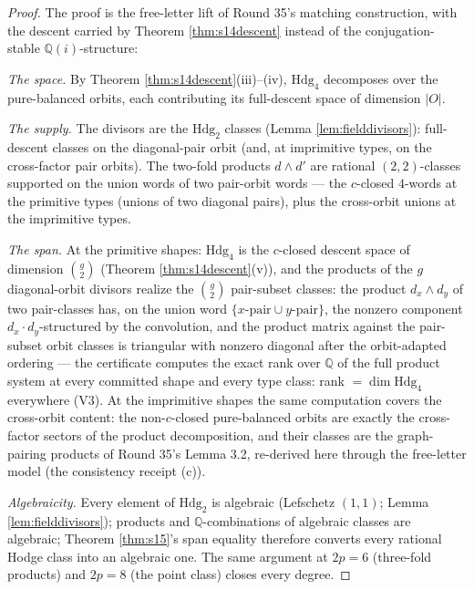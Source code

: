 \documentclass[11pt]{article}
\newcommand{\Q}{\mathbb{Q}}
\newcommand{\Hdg}{\mathrm{Hdg}}
\begin{document}
\begin{proof}
The proof is the free-letter lift of Round 35's matching construction, with the
descent carried by Theorem \ref{thm:s14descent} instead of the
conjugation-stable $\Q(i)$-structure:

\emph{The space.} By Theorem \ref{thm:s14descent}(iii)--(iv),
$\Hdg_{4}$ decomposes over the pure-balanced orbits, each contributing its
full-descent space of dimension $\left|O\right|$.

\emph{The supply.} The divisors are the $\Hdg_2$ classes (Lemma
\ref{lem:fielddivisors}): full-descent classes on the diagonal-pair orbit (and,
at imprimitive types, on the cross-factor pair orbits). The two-fold products
$d\wedge d'$ are rational $(2,2)$-classes supported on the union words of two
pair-orbit words --- the $c$-closed $4$-words at the primitive types (unions of
two diagonal pairs), plus the cross-orbit unions at the imprimitive types.

\emph{The span.} At the primitive shapes: $\Hdg_4$ is the $c$-closed descent
space of dimension $\binom{g}{2}$ (Theorem \ref{thm:s14descent}(v)), and the
products of the $g$ diagonal-orbit divisors realize the $\binom{g}{2}$
pair-subset classes: the product $d_{x}\wedge d_{y}$ of two pair-classes has,
on the union word $\{x\text{-pair}\cup y\text{-pair}\}$, the nonzero component
$d_x\cdot d_y$-structured by the convolution, and the product matrix against the
pair-subset orbit classes is triangular with nonzero diagonal after the
orbit-adapted ordering --- the certificate computes the exact rank over $\Q$ of
the full product system at every committed shape and every type class: rank
$=\dim\Hdg_4$ everywhere (V3). At the imprimitive shapes the same computation
covers the cross-orbit content: the non-$c$-closed pure-balanced orbits are
exactly the cross-factor sectors of the product decomposition, and their classes
are the graph-pairing products of Round 35's Lemma 3.2, re-derived here through
the free-letter model (the consistency receipt (c)).

\emph{Algebraicity.} Every element of $\Hdg_2$ is algebraic (Lefschetz
$(1,1)$; Lemma \ref{lem:fielddivisors}); products and $\Q$-combinations of
algebraic classes are algebraic; Theorem \ref{thm:s15}'s span equality
therefore converts every rational Hodge class into an algebraic one. The same
argument at $2p=6$ (three-fold products) and $2p=8$ (the point class) closes
every degree.
\end{proof}
\end{document}
